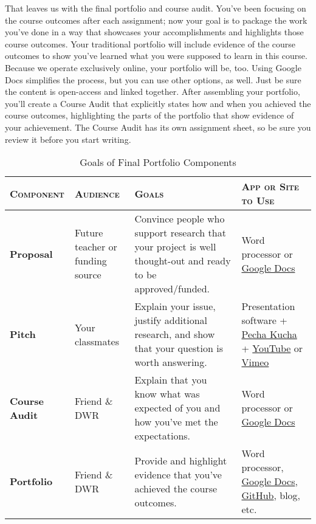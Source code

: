 \documentclass[10pt,oneside]{amsart}	%
\begin{document}
That leaves us with the final portfolio and course audit. You've been focusing on the course outcomes after each assignment; now your goal is to package the work you've done in a way that showcases your accomplishments and highlights those course outcomes. Your traditional portfolio will include evidence of the course outcomes to show you've learned what you were supposed to learn in this course. Because we operate exclusively online, your portfolio will be, too. Using Google Docs simplifies the process, but you can use other options, as well. Just be sure the content is open-access and linked together. After assembling your portfolio, you'll create a Course Audit that explicitly states how and when you achieved the course outcomes, highlighting the parts of the portfolio that show evidence of your achievement. The Course Audit has its own assignment sheet, so be sure you review it before you start writing.

\begin{table}[b]%
	\caption{Goals of Final Portfolio Components}\label{tab:goals}
\begin{tabulary}{\textwidth}{lLLL}
	\toprule  \textbf{\textsc{Component}} & \mbox{\textbf{\textsc{Audience}}} & \textbf{\textsc{Goals}} & \textbf{\textsc{App or Site to Use}}\\
\midrule	\textbf{Proposal} & Future teacher or funding source & Convince people who support research that your project is well thought-out and ready to be approved/funded. & Word processor or \href{http://docs.google.com}{Google Docs} \\
\midrule	\textbf{Pitch} & Your classmates & Explain your issue, justify additional research, and show that your question is worth answering. & Presentation software + \href{http://www.pechakucha.org/}{Pecha Kucha} + \href{http://www.youtube.com/}{YouTube} or \href{https://vimeo.com/}{Vimeo} \\
\midrule	\textbf{Course Audit} & Friend \& DWR & Explain that you know what was expected of you and how you've met the expectations. & Word processor or \href{http://docs.google.com}{Google Docs} \\
\midrule	\textbf{Portfolio} & Friend \& DWR  & Provide and highlight evidence that you've achieved the course outcomes. & Word processor, \href{http://docs.google.com}{Google Docs}, \href{https://github.com/}{GitHub}, blog, etc. \\
	\bottomrule
\end{tabulary}
\end{table}
\end{document}

